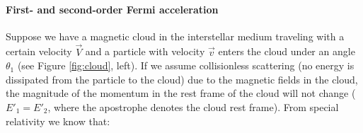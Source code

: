 \paragraph{First- and second-order Fermi acceleration}
\label{para:fermiacceleration}

Suppose we have a magnetic cloud in the interstellar medium traveling with a certain velocity $\vec{V}$ and a particle with velocity $\vec{v}$ enters the cloud under an angle $\theta_1$ (see Figure \ref{fig:cloud}, left). If we assume collisionless scattering (no energy is dissipated from the particle to the cloud) due to the magnetic fields in the cloud, the magnitude of the momentum in the rest frame of the cloud will not change ($E'_1 = E'_2$, where the apostrophe denotes the cloud rest frame). From special relativity we know that:

